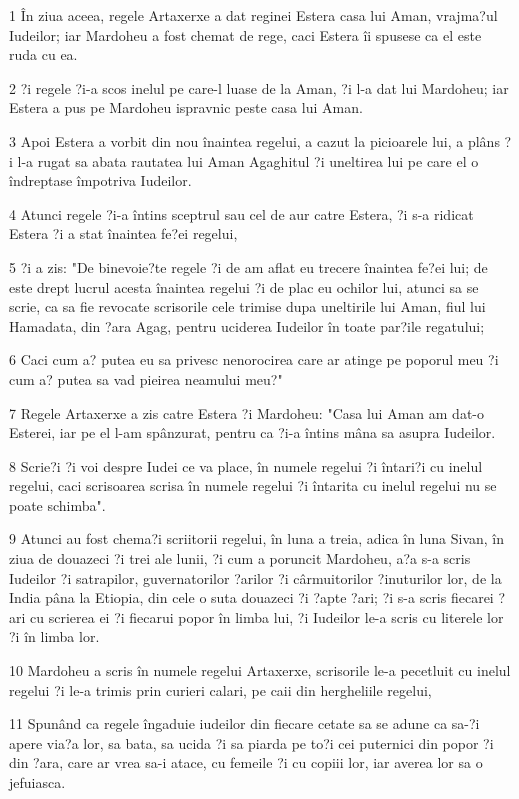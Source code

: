 \par 1 În ziua aceea, regele Artaxerxe a dat reginei Estera casa lui Aman, vrajma?ul Iudeilor; iar Mardoheu a fost chemat de rege, caci Estera îi spusese ca el este ruda cu ea.
\par 2 ?i regele ?i-a scos inelul pe care-l luase de la Aman, ?i l-a dat lui Mardoheu; iar Estera a pus pe Mardoheu ispravnic peste casa lui Aman.
\par 3 Apoi Estera a vorbit din nou înaintea regelui, a cazut la picioarele lui, a plâns ?i l-a rugat sa abata rautatea lui Aman Agaghitul ?i uneltirea lui pe care el o îndreptase împotriva Iudeilor.
\par 4 Atunci regele ?i-a întins sceptrul sau cel de aur catre Estera, ?i s-a ridicat Estera ?i a stat înaintea fe?ei regelui,
\par 5 ?i a zis: "De binevoie?te regele ?i de am aflat eu trecere înaintea fe?ei lui; de este drept lucrul acesta înaintea regelui ?i de plac eu ochilor lui, atunci sa se scrie, ca sa fie revocate scrisorile cele trimise dupa uneltirile lui Aman, fiul lui Hamadata, din ?ara Agag, pentru uciderea Iudeilor în toate par?ile regatului;
\par 6 Caci cum a? putea eu sa privesc nenorocirea care ar atinge pe poporul meu ?i cum a? putea sa vad pieirea neamului meu?"
\par 7 Regele Artaxerxe a zis catre Estera ?i Mardoheu: "Casa lui Aman am dat-o Esterei, iar pe el l-am spânzurat, pentru ca ?i-a întins mâna sa asupra Iudeilor.
\par 8 Scrie?i ?i voi despre Iudei ce va place, în numele regelui ?i întari?i cu inelul regelui, caci scrisoarea scrisa în numele regelui ?i întarita cu inelul regelui nu se poate schimba".
\par 9 Atunci au fost chema?i scriitorii regelui, în luna a treia, adica în luna Sivan, în ziua de douazeci ?i trei ale lunii, ?i cum a poruncit Mardoheu, a?a s-a scris Iudeilor ?i satrapilor, guvernatorilor ?arilor ?i cârmuitorilor ?inuturilor lor, de la India pâna la Etiopia, din cele o suta douazeci ?i ?apte ?ari; ?i s-a scris fiecarei ?ari cu scrierea ei ?i fiecarui popor în limba lui, ?i Iudeilor le-a scris cu literele lor ?i în limba lor.
\par 10 Mardoheu a scris în numele regelui Artaxerxe, scrisorile le-a pecetluit cu inelul regelui ?i le-a trimis prin curieri calari, pe caii din hergheliile regelui,
\par 11 Spunând ca regele îngaduie iudeilor din fiecare cetate sa se adune ca sa-?i apere via?a lor, sa bata, sa ucida ?i sa piarda pe to?i cei puternici din popor ?i din ?ara, care ar vrea sa-i atace, cu femeile ?i cu copiii lor, iar averea lor sa o jefuiasca.
